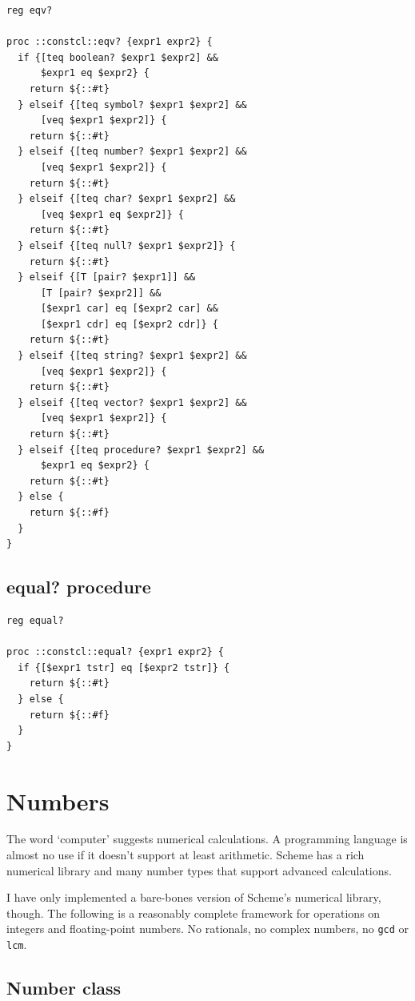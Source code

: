 \documentclass[twoside]{report}
\begin{document}
\begin{lstlisting}
reg eqv?

proc ::constcl::eqv? {expr1 expr2} {
  if {[teq boolean? $expr1 $expr2] &&
      $expr1 eq $expr2} {
    return ${::#t}
  } elseif {[teq symbol? $expr1 $expr2] &&
      [veq $expr1 $expr2]} {
    return ${::#t}
  } elseif {[teq number? $expr1 $expr2] &&
      [veq $expr1 $expr2]} {
    return ${::#t}
  } elseif {[teq char? $expr1 $expr2] &&
      [veq $expr1 eq $expr2]} {
    return ${::#t}
  } elseif {[teq null? $expr1 $expr2]} {
    return ${::#t}
  } elseif {[T [pair? $expr1]] &&
      [T [pair? $expr2]] &&
      [$expr1 car] eq [$expr2 car] &&
      [$expr1 cdr] eq [$expr2 cdr]} {
    return ${::#t}
  } elseif {[teq string? $expr1 $expr2] &&
      [veq $expr1 $expr2]} {
    return ${::#t}
  } elseif {[teq vector? $expr1 $expr2] &&
      [veq $expr1 $expr2]} {
    return ${::#t}
  } elseif {[teq procedure? $expr1 $expr2] &&
      $expr1 eq $expr2} {
    return ${::#t}
  } else {
    return ${::#f}
  }
}
\end{lstlisting}

\subsection{equal? procedure}
\label{equal-procedure}

\begin{lstlisting}
reg equal?

proc ::constcl::equal? {expr1 expr2} {
  if {[$expr1 tstr] eq [$expr2 tstr]} {
    return ${::#t}
  } else {
    return ${::#f}
  }
}
\end{lstlisting}

\section{Numbers}
\label{numbers}

The word `computer' suggests numerical calculations. A programming language is almost no use if it doesn't support at least arithmetic. Scheme has a rich numerical library and many number types that support advanced calculations.

I have only implemented a bare-bones version of Scheme's numerical library, though. The following is a reasonably complete framework for operations on integers and floating-point numbers. No rationals, no complex numbers, no \texttt{gcd} or \texttt{lcm}.

\subsection{Number class}
\label{number-class}
\end{document}
